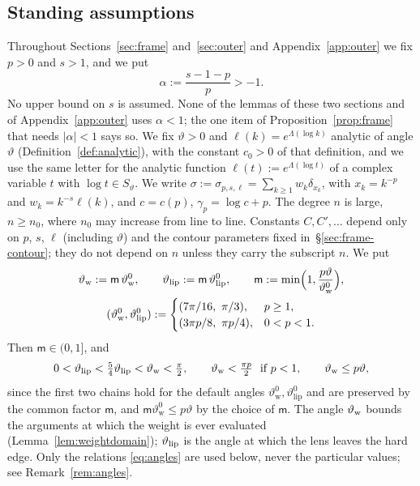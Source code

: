 \subsection{Standing assumptions}\label{sec:frame-standing}
Throughout Sections~\ref{sec:frame} and~\ref{sec:outer} and Appendix~\ref{app:outer} we fix $p>0$ and $s>1$, and we put
\begin{equation}\label{eq:alpha}
  \alpha:=\frac{s-1-p}{p}>-1.
\end{equation}
No upper bound on $s$ is assumed. None of the lemmas of these two sections and of Appendix~\ref{app:outer} uses
$\alpha<1$; the one item of Proposition~\ref{prop:frame} that needs $|\alpha|<1$ says so. We fix $\vartheta>0$ and
$\ell(k)=e^{\Lambda(\log k)}$ analytic of angle $\vartheta$ (Definition~\ref{def:analytic}), with the constant $c_0>0$
of that definition, and we use the same letter for the analytic function $\ell(t):=e^{\Lambda(\log t)}$ of a complex
variable $t$ with $\log t\in S_\vartheta$. We write $\sigma:=\sigma_{p,s,\ell}=\sum_{k\ge1}w_k\delta_{x_k}$, with
$x_k=k^{-p}$ and $w_k=k^{-s}\ell(k)$, and $c=c(p)$, $\gamma_p=\log c+p$. The degree $n$ is large, $n\ge n_0$, where $n_0$
may increase from line to line. Constants $C,C',\dots$ depend only on $p$, $s$, $\ell$ (including $\vartheta$) and the
contour parameters fixed in~\S\ref{sec:frame-contour}; they do not depend on $n$ unless they carry the subscript $n$. We
put
\begin{equation}\label{eq:thetaw}
\begin{gathered}
  \thw:=\mathsf m\,\vartheta_{\mathrm w}^{0},\qquad \thlip:=\mathsf m\,\vartheta_{\mathrm{lip}}^{0},\qquad
  \mathsf m:=\min\Bigl(1,\frac{p\vartheta}{\vartheta_{\mathrm w}^{0}}\Bigr),\\
  (\vartheta_{\mathrm w}^{0},\vartheta_{\mathrm{lip}}^{0}):=\begin{cases}(7\pi/16,\ \pi/3),&p\ge1,\\ (3\pi p/8,\ \pi p/4),&0<p<1.\end{cases}
\end{gathered}
\end{equation}
Then $\mathsf m\in(0,1]$, and
\begin{equation}\label{eq:angles}
  0<\vartheta_{\mathrm{lip}}<\tfrac54\vartheta_{\mathrm{lip}}<\vartheta_{\mathrm{w}}<\tfrac\pi2,\qquad \vartheta_{\mathrm{w}}<\tfrac{\pi p}2\ \text{ if }p<1,\qquad \vartheta_{\mathrm{w}}\le p\vartheta ,
\end{equation}
since the first two chains hold for the default angles $\vartheta_{\mathrm w}^{0},\vartheta_{\mathrm{lip}}^{0}$ and are
preserved by the common factor $\mathsf m$, and $\mathsf m\vartheta_{\mathrm w}^{0}\le p\vartheta$ by the choice of
$\mathsf m$. The angle $\vartheta_{\mathrm{w}}$ bounds the arguments at which the weight is ever evaluated
(Lemma~\ref{lem:weightdomain}); $\vartheta_{\mathrm{lip}}$ is the angle at which the lens leaves the hard edge. Only the relations
\eqref{eq:angles} are used below, never the particular values; see Remark~\ref{rem:angles}.


